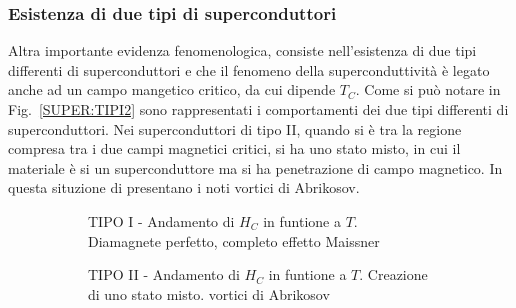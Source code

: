\subsubsection{Esistenza di due tipi di superconduttori}
Altra importante evidenza fenomenologica, consiste nell'esistenza di due tipi differenti di superconduttori e che il fenomeno della superconduttivit\`a \`e legato anche ad un campo mangetico critico, da cui dipende $T_C$.
Come si pu\`o notare in Fig.~\ref{SUPER:TIPI2} sono rappresentati i comportamenti dei due tipi differenti di superconduttori. Nei superconduttori di tipo II, quando si \`e tra la regione compresa tra i due campi magnetici critici, si ha uno stato misto, in cui il materiale \`e si un superconduttore ma si ha penetrazione di campo magnetico. In questa situzione di presentano i noti vortici di Abrikosov. 
\begin{figure}[H]
	\centering
	\begin{subfigure}[b]{0.4\textwidth}
	\caption{TIPO I - Andamento di $H_C$ in funtione a $T$. Diamagnete perfetto, completo effetto Maissner}
	\end{subfigure}
	\qquad\quad
	\begin{subfigure}[b]{0.4\textwidth}
	\caption{TIPO II - Andamento di $H_C$ in funtione a $T$. Creazione di uno stato misto. vortici di Abrikosov}
	\end{subfigure}
	\qquad\quad
        \begin{subfigure}[b]{0.4\textwidth}
\end{subfigure}
\end{figure}
